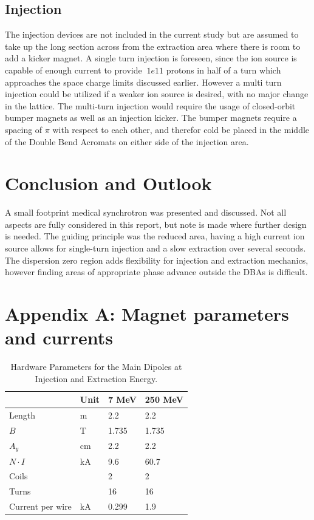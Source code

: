 \subsection{Injection}
The injection devices are not included in the current study but are assumed to take up the long section across from the extraction area where there is room to add 
a kicker magnet.  A single turn injection is foreseen, since the ion source is capable of enough current to provide $~1e11$ protons in half of a turn which approaches
the space charge limits discussed earlier.  However a multi turn injection could be utilized if a weaker ion source is desired, with no major change in the lattice. The
multi-turn injection would require the usage of closed-orbit bumper magnets as well as an injection kicker.  The bumper magnets require a spacing of $\pi$ with respect
to each other, and therefor cold be placed in the middle of the Double Bend Acromats on either side of the injection area.   
 
\section{Conclusion and Outlook}
A small footprint medical synchrotron was presented and discussed.  Not all aspects are fully considered in this report, but note is made where further
design is needed.  The guiding principle was the reduced area, having a high current ion source allows for single-turn injection and a slow extraction over several
seconds.  The dispersion zero region adds flexibility for injection and extraction mechanics, however finding areas of appropriate phase advance outside the DBAs is 
difficult.  
 
\section{Appendix A: Magnet parameters and currents}

\begin{table}[]
  \caption{Hardware Parameters for the Main Dipoles at Injection and Extraction Energy.}
  \centering
  \begin{tabular}{@{}llll@{}}
          \toprule
          & \textbf{Unit} & \textbf{7 MeV} & \textbf{250 MeV} \\ 
          \hline \hline

          Length           & m    & 2.2   & 2.2     \\
          $B$              & T    & 1.735 & 1.735   \\
          $A_y$            & cm   & 2.2   & 2.2     \\
          $N \cdot I$      & kA   & 9.6   & 60.7    \\
          Coils            &      & 2     & 2       \\
          Turns            &      & 16    & 16      \\
          Current per wire & kA   & 0.299 & 1.9     \\ \bottomrule
        \end{tabular}
      \end{table}
      \label{tab:bend}

